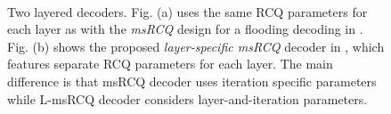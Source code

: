 \documentclass [PhD] {uclathes}
\begin{document}
\begin{figure}[tp] 
    \centering
\\
  \caption{ Two layered decoders. Fig. (a) uses the same RCQ parameters for each layer as with the  \textit{msRCQ} design for a flooding decoding in \cite{Wang2020-RCQ}. Fig. (b) shows the proposed \textit{layer-specific msRCQ} decoder in \cite{Terrill2021-ec}, which features  separate RCQ parameters for each layer.
  The main difference is that msRCQ decoder uses iteration specific parameters while L-msRCQ decoder considers layer-and-iteration parameters.
  }
\end{figure}
\end{document}
